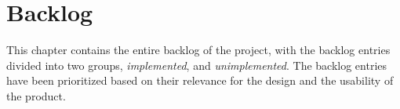 \chapter{Backlog}
\label{chap:backlog}

This chapter contains the entire backlog of the project, with the backlog entries divided into two groups, \emph{implemented}, and \emph{unimplemented}. 
The backlog entries have been prioritized based on their relevance for the design and the usability of the product.




